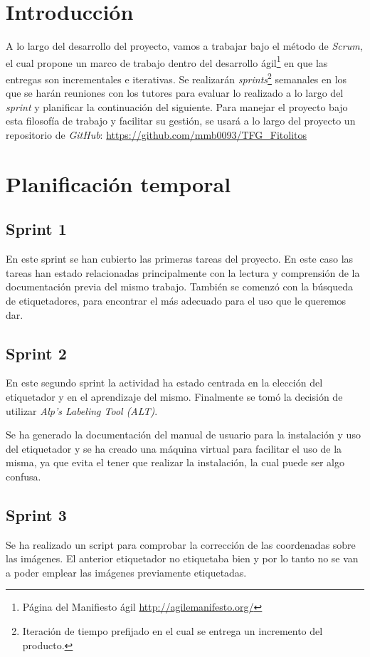 
\section{Introducción}
A lo largo del desarrollo del proyecto, vamos a trabajar bajo el método de \textit{Scrum}, el cual propone un marco de trabajo dentro del desarrollo ágil\footnote{Página del Manifiesto ágil \url{http://agilemanifesto.org/}} en que las entregas son incrementales e iterativas. Se realizarán \textit{sprints}\footnote{Iteración de tiempo prefijado en el cual se entrega un incremento del producto.} semanales en los que se harán reuniones con los tutores para evaluar lo realizado a lo largo del \textit{sprint} y planificar la continuación del siguiente.
Para manejar el proyecto bajo esta filosofía de trabajo y facilitar su gestión, se usará a lo largo del proyecto un repositorio de \textit{GitHub}: \url{https://github.com/mmb0093/TFG_Fitolitos}

\section{Planificación temporal}
\subsection{Sprint 1}
En este sprint se han cubierto las primeras tareas del proyecto. En este caso las tareas han estado relacionadas principalmente con la lectura y comprensión de la documentación previa del mismo trabajo.
También se comenzó con la búsqueda de etiquetadores, para encontrar el más adecuado para el uso que le queremos dar.


\subsection{Sprint 2}
En este segundo sprint la actividad ha estado centrada en la elección del etiquetador y en el aprendizaje del mismo. Finalmente se tomó la decisión de utilizar \textit{Alp’s Labeling Tool (ALT)}. 

Se ha generado la documentación del manual de usuario para la instalación y uso del etiquetador y se ha creado una máquina virtual para facilitar el uso de la misma, ya que evita el tener que realizar la instalación, la cual puede ser algo confusa.

 

\subsection{Sprint 3}
Se ha realizado un script para comprobar la corrección de las coordenadas sobre las imágenes. El anterior etiquetador no etiquetaba bien y por lo tanto no se van a poder emplear las imágenes previamente etiquetadas.


